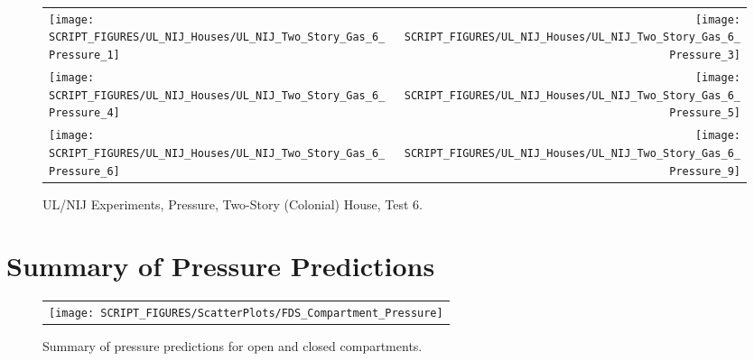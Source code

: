 \begin{figure}[p]
\begin{tabular*}{\textwidth}{l@{\extracolsep{\fill}}r}
\texttt{[image: SCRIPT\_FIGURES/UL\_NIJ\_Houses/UL\_NIJ\_Two\_Story\_Gas\_6\_Pressure\_1]} &
\texttt{[image: SCRIPT\_FIGURES/UL\_NIJ\_Houses/UL\_NIJ\_Two\_Story\_Gas\_6\_Pressure\_3]} \\
\texttt{[image: SCRIPT\_FIGURES/UL\_NIJ\_Houses/UL\_NIJ\_Two\_Story\_Gas\_6\_Pressure\_4]} &
\texttt{[image: SCRIPT\_FIGURES/UL\_NIJ\_Houses/UL\_NIJ\_Two\_Story\_Gas\_6\_Pressure\_5]} \\
\texttt{[image: SCRIPT\_FIGURES/UL\_NIJ\_Houses/UL\_NIJ\_Two\_Story\_Gas\_6\_Pressure\_6]} &
\texttt{[image: SCRIPT\_FIGURES/UL\_NIJ\_Houses/UL\_NIJ\_Two\_Story\_Gas\_6\_Pressure\_9]}
\end{tabular*}
\caption[UL/NIJ Experiments, Pressure, Two-Story (Colonial) House, Test 6]{UL/NIJ Experiments, Pressure, Two-Story (Colonial) House, Test 6.}
\label{UL_NIJ_Pres_Colonial_6}
\end{figure}

\clearpage

\section{Summary of Pressure Predictions}
\label{Compartment Over-Pressure}

\begin{figure}[h!]
\begin{center}
\begin{tabular}{c}
\texttt{[image: SCRIPT\_FIGURES/ScatterPlots/FDS\_Compartment\_Pressure]}
\end{tabular}
\end{center}
\caption[Summary of pressure predictions]{Summary of pressure predictions for open and closed compartments.}
\label{Pressure_Summary}
\end{figure}

